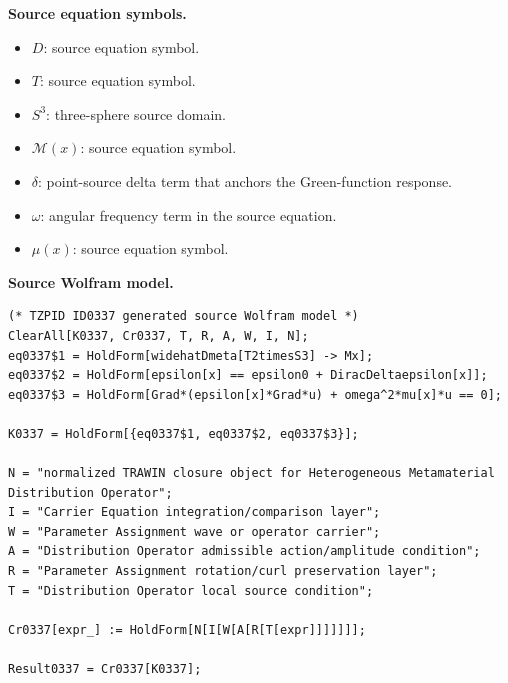 \begin{minipage}[t]{0.49\linewidth}
\begingroup
\small
\raggedright
\textbf{Source equation symbols.}\par
\begin{itemize}[leftmargin=1.35em,itemsep=1pt,topsep=1pt,parsep=0pt]
    \item $D$: source equation symbol.
    \item $T$: source equation symbol.
    \item $S^{3}$: three-sphere source domain.
    \item $\mathcal{M}(x)$: source equation symbol.
    \item $\delta$: point-source delta term that anchors the Green-function response.
    \item $\omega$: angular frequency term in the source equation.
    \item $\mu(x)$: source equation symbol.
\end{itemize}
\endgroup
\end{minipage}\hfill
\begin{minipage}[t]{0.47\linewidth}
\begingroup
\scriptsize
\raggedright
\textbf{Source Wolfram model.}\par
\begin{Verbatim}[fontsize=\tiny,breaklines=true,breakanywhere=true]
(* TZPID ID0337 generated source Wolfram model *)
ClearAll[K0337, Cr0337, T, R, A, W, I, N];
eq0337$1 = HoldForm[widehatDmeta[T2timesS3] -> Mx];
eq0337$2 = HoldForm[epsilon[x] == epsilon0 + DiracDeltaepsilon[x]];
eq0337$3 = HoldForm[Grad*(epsilon[x]*Grad*u) + omega^2*mu[x]*u == 0];

K0337 = HoldForm[{eq0337$1, eq0337$2, eq0337$3}];

N = "normalized TRAWIN closure object for Heterogeneous Metamaterial Distribution Operator";
I = "Carrier Equation integration/comparison layer";
W = "Parameter Assignment wave or operator carrier";
A = "Distribution Operator admissible action/amplitude condition";
R = "Parameter Assignment rotation/curl preservation layer";
T = "Distribution Operator local source condition";

Cr0337[expr_] := HoldForm[N[I[W[A[R[T[expr]]]]]]];

Result0337 = Cr0337[K0337];
\end{Verbatim}
\endgroup
\end{minipage}

